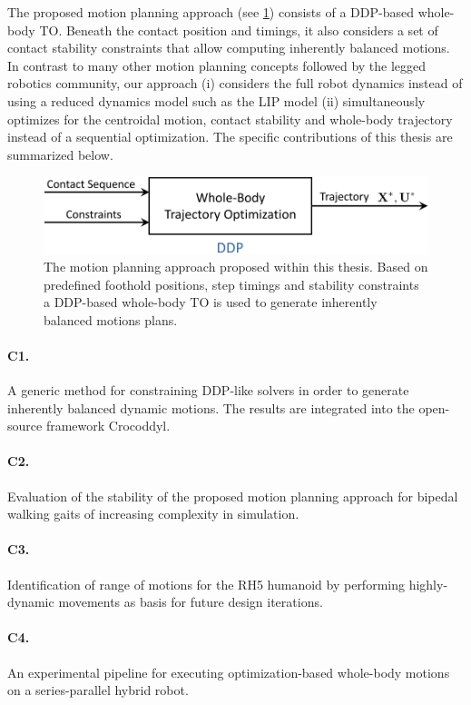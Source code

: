 The proposed motion planning approach (see \cref{img:approach}) consists of a DDP-based whole-body \gls{TO}. 
Beneath the contact position and timings, it also considers a set of contact stability constraints that allow computing inherently balanced motions. In contrast to many other motion planning concepts followed by the legged robotics community, our approach (i) considers the full robot dynamics instead of using a reduced dynamics model such as the \gls{LIP} model (ii) simultaneously optimizes for the centroidal motion, contact stability and whole-body trajectory instead of a sequential optimization. The specific contributions of this thesis are summarized below.
\begin{figure}[h!]
\centering	
\includegraphics[width=.8\textwidth]{img/approach}
\caption{The motion planning approach proposed within this thesis. Based on predefined foothold positions, step timings and stability constraints a \gls{DDP}-based whole-body \gls{TO} is used to generate inherently balanced motions plans.}
\label{img:approach}
\end{figure}

\paragraph{C1.} A generic method for constraining DDP-like solvers in order to generate inherently balanced dynamic motions. The results are integrated into the open-source framework Crocoddyl.
\paragraph{C2.} Evaluation of the stability of the proposed motion planning approach for bipedal walking gaits of increasing complexity in simulation. 
\paragraph{C3.} Identification of range of motions for the RH5 humanoid by performing highly-dynamic movements as basis for future design iterations. 
\paragraph{C4.} An experimental pipeline for executing optimization-based whole-body motions on a series-parallel hybrid robot.   


